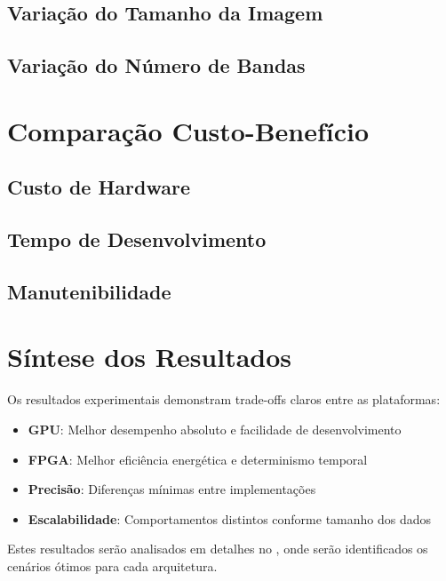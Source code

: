 \subsection{Variação do Tamanho da Imagem}

\subsection{Variação do Número de Bandas}

\section{Comparação Custo-Benefício}\label{sec:custo_beneficio}

\subsection{Custo de Hardware}

\subsection{Tempo de Desenvolvimento}

\subsection{Manutenibilidade}

\section{Síntese dos Resultados}\label{sec:sintese_resultados}

Os resultados experimentais demonstram trade-offs claros entre as plataformas:

\begin{itemize}
    \item \textbf{GPU}: Melhor desempenho absoluto e facilidade de desenvolvimento
    \item \textbf{FPGA}: Melhor eficiência energética e determinismo temporal
    \item \textbf{Precisão}: Diferenças mínimas entre implementações
    \item \textbf{Escalabilidade}: Comportamentos distintos conforme tamanho dos dados
\end{itemize}

Estes resultados serão analisados em detalhes no , onde serão identificados os cenários ótimos para cada arquitetura. 